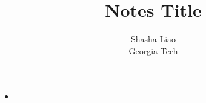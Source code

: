 \documentclass[twoside,12pt]{article}
\begin{document}
\title{Notes Title}
\author {Shasha Liao \\ Georgia Tech}
\maketitle
\section{}
\begin{itemize}
\item
\end{itemize}
\end{document}
